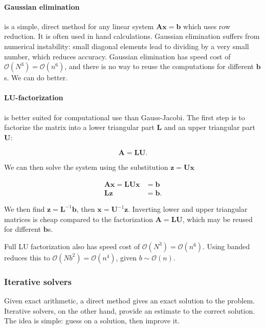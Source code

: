 \paragraph*{Gaussian elimination} is a simple, direct method for any linear system $\mathbf{A}\mathbf{x} = \mathbf{b}$ which uses row reduction. It is often used in hand calculations. Gaussian elimination suffers from numerical instability: small diagonal elements lead to dividing by a very small number, which reduces accuracy. Gaussian elimination has speed cost of $\mathcal{O}(N^3) = \mathcal{O}(n^6)$, and there is no way to reuse the computations for different $\mathbf{b}$s. We can do better.

\paragraph*{LU-factorization} is better suited for computational use than Gauss-Jacobi. The first step is to factorize the matrix into a lower triangular part $\mathbf{L}$ and an upper triangular part $\mathbf{U}$:

\begin{equation}
  \mathbf{A} = \mathbf{L} \mathbf{U}.
\end{equation}

We can then solve the system using the substitution $\mathbf{z} = \mathbf{U} \mathbf{x}$

\begin{align}
  \mathbf{A} \mathbf{x} = \mathbf{L} \mathbf{U} \mathbf{x} &= \mathbf{b} \\
  \mathbf{L} \mathbf{z} &= \mathbf{b}.
\end{align}

We then find $\mathbf{z} = \mathbf{L}^{-1} \mathbf{b}$, then $\mathbf{x} = \mathbf{U}^{-1} \mathbf{z}$. Inverting lower and upper triangular matrices is cheap compared to the factorization $\mathbf{A} = \mathbf{L} \mathbf{U}$, which may be reused for different $\mathbf{b}$s.

Full LU factorization also has speed cost of $\mathcal{O}(N^3) = \mathcal{O}(n^6)$. Using banded reduces this to $\mathcal{O}(N b^2) = \mathcal{O}(n^4)$, given $b \sim \mathcal{O}(n)$.

\subsubsection{Iterative solvers}
Given exact arithmetic, a direct method gives an exact solution to the problem. Iterative solvers, on the other hand, provide an estimate to the correct solution. The idea is simple: guess on a solution, then improve it.

